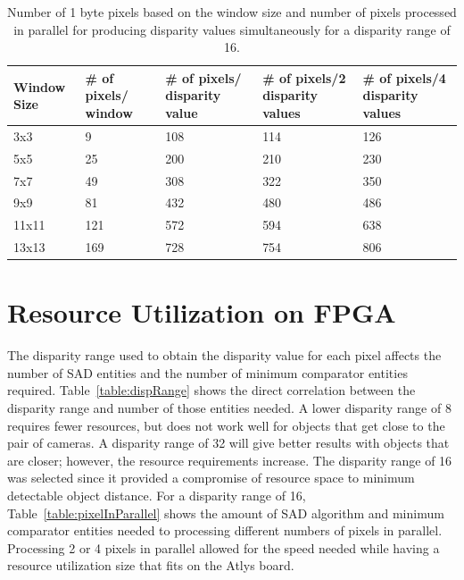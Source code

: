 \begin{table}
\begin{center}
	\begin{tabular}{| p{1.7cm} | p{2.5cm} | p{2.7cm} | p{2.7cm} | p{2.7cm} |}
		\hline
		\rowstyle{\bfseries} Window Size & 
		\rowstyle{\bfseries} \# of pixels/ window & 
		\rowstyle{\bfseries} \# of pixels/ disparity value &
		\rowstyle{\bfseries} \# of pixels/2 disparity values & 
		\rowstyle{\bfseries} \# of pixels/4 disparity values %
		\tabularnewline
		\hline
		3x3 & 9 & 108 & 114 & 126
		\tabularnewline
		\hline
		5x5 & 25 & 200 & 210 & 230
		\tabularnewline
		\hline
		\rowstyle{\bfseries} 7x7 & 
		\rowstyle{\bfseries} 49 & 
		\rowstyle{\bfseries} 308 & 
		\rowstyle{\bfseries} 322 & 
		\rowstyle{\bfseries} 350
		\tabularnewline
		\hline
		\rowstyle{\bfseries} 9x9 & 
		\rowstyle{\bfseries} 81 & 
		\rowstyle{\bfseries} 432 & 
		\rowstyle{\bfseries} 480 & 
		\rowstyle{\bfseries} 486
		\tabularnewline
		\hline
		11x11 & 121 & 572 & 594 & 638
		\tabularnewline
		\hline
		13x13 & 169 & 728 & 754 & 806		
 		\tabularnewline
		\hline 
	\end{tabular}
	\captionfonts
	\caption{Number of 1 byte pixels based on the window size and number of pixels processed in parallel for producing disparity values simultaneously for a disparity range of 16.}
	\label{table:pixelCount}
\end{center}
\end{table}

\section{Resource Utilization on FPGA}
\label{sec:utilize}

The disparity range used to obtain the disparity value for each pixel affects the number of SAD entities and the number of minimum comparator entities required. Table~\ref{table:dispRange} shows the direct correlation between the disparity range and number of those entities needed. A lower disparity range of 8 requires fewer resources, but does not work well for objects that get close to the pair of cameras. A disparity range of 32 will give better results with objects that are closer; however, the resource requirements increase. The disparity range of 16 was selected since it provided a compromise of resource space to minimum detectable object distance. For a disparity range of 16, Table~\ref{table:pixelInParallel} shows the amount of SAD algorithm and minimum comparator entities needed to processing different numbers of pixels in parallel. Processing 2 or 4 pixels in parallel allowed for the speed needed while having a resource utilization size that fits on the Atlys board.

